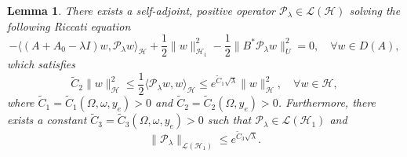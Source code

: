 \documentclass[a4paper]{article}
\newtheorem{lemma}[theorem]{Lemma}
\numberwithin{equation}{section}
\begin{document}
\begin{lemma}\label{lemma3.1-NS}
There exists a self-adjoint, positive operator $\mathcal P_\lambda\in \mathcal L(\mathcal H)$ solving the following Riccati equation
\begin{equation}\label{RI-NS} 
-\langle( A+A_0-\lambda I) w,\mathcal P_\lambda w\rangle_{\mathcal H}+\frac 12\|w\|_{\mathcal H_1}^2-\frac 12	\|B^*\mathcal P_\lambda w\|_U^2=0,
\quad \forall w\in D( A),\end{equation}
which satisfies
\begin{equation}\label{P-RI-NS-BOUND-H-H}
\tilde C_2 \|w\|_{\mathcal H}^2\le\frac{1}{2}\langle \mathcal{P}_\lambda w,w\rangle_{\mathcal{H}}\le e^{\tilde C_1\sqrt{\lambda}}\|w\|_{\mathcal H}^2,\quad \forall w\in\mathcal H,
\end{equation}
where $\tilde C_1=\tilde C_1(\Omega,\omega,y_e)>0$ and $\tilde C_2=\tilde C_2(\Omega,y_e)>0$. Furthermore, there exists a constant $\tilde C_3=\tilde C_3(\Omega,\omega,y_e)>0$ such that $\mathcal P_\lambda\in \mathcal L(\mathcal H_1)$ and
\begin{equation}\label{P-RI-NS-BOUND-V-H}
\|\mathcal P_\lambda\|_{ \mathcal L(\mathcal H_1)}\le e^{\tilde C_3 \sqrt{\lambda}}.
\end{equation}
\end{lemma}
\end{document}
